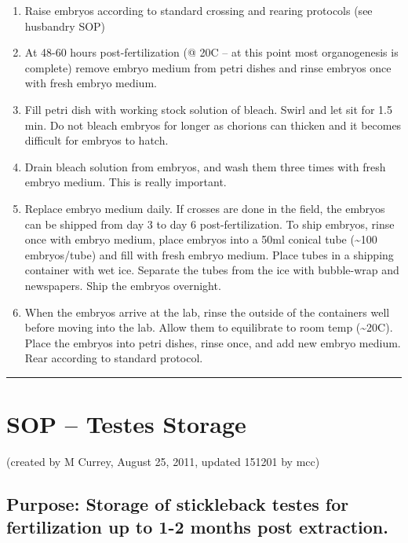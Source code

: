 \documentclass[
]{book}
\begin{document}
\begin{enumerate}
\def\labelenumi{\arabic{enumi}.}
\item
  Raise embryos according to standard crossing and rearing protocols (see husbandry SOP)
\item
  At 48-60 hours post-fertilization (@ 20C -- at this point most organogenesis is complete) remove embryo medium from petri dishes and rinse embryos once with fresh embryo medium.
\item
  Fill petri dish with working stock solution of bleach. Swirl and let sit for 1.5 min. Do not bleach embryos for longer as chorions can thicken and it becomes difficult for embryos to hatch.
\item
  Drain bleach solution from embryos, and wash them three times with fresh embryo medium. This is really important.
\item
  Replace embryo medium daily. If crosses are done in the field, the embryos can be shipped from day 3 to day 6 post-fertilization. To ship embryos, rinse once with embryo medium, place embryos into a 50ml conical tube (\textasciitilde100 embryos/tube) and fill with fresh embryo medium. Place tubes in a shipping container with wet ice. Separate the tubes from the ice with bubble-wrap and newspapers. Ship the embryos overnight.
\item
  When the embryos arrive at the lab, rinse the outside of the containers well before moving into the lab. Allow them to equilibrate to room temp (\textasciitilde20C). Place the embryos into petri dishes, rinse once, and add new embryo medium. Rear according to standard protocol.
\end{enumerate}

\begin{center}\rule{0.5\linewidth}{0.5pt}\end{center}

\hypertarget{sop-testes-storage}{%
\section{SOP -- Testes Storage}\label{sop-testes-storage}}

(created by M Currey, August 25, 2011, updated 151201 by mcc)

\hypertarget{purpose-storage-of-stickleback-testes-for-fertilization-up-to-1-2-months-post-extraction.}{%
\subsection{Purpose: Storage of stickleback testes for fertilization up to 1-2 months post extraction.}\label{purpose-storage-of-stickleback-testes-for-fertilization-up-to-1-2-months-post-extraction.}}
\end{document}
